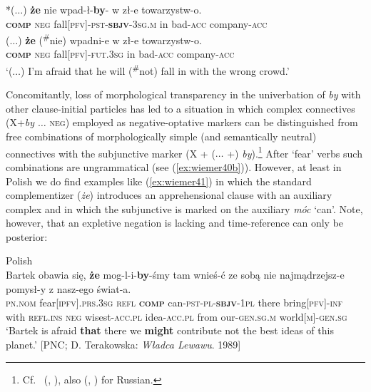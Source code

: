 \documentclass[output=paper,colorlinks,citecolor=brown]{langscibook}
\begin{document}
\ex \label{ex:wiemer40b}
\gll \textnormal{*($\ldots$)} \textbf{że} nie wpad-ł-\textbf{by}-\emptyset {} w zł-e towarzystw-o. \\
{} \textbf{\textsc{comp}} \textsc{neg} fall\textsc{[pfv]-pst-\textbf{sbjv}-3sg.m} in bad-\textsc{acc} company-\textsc{acc} \\
\ex \label{ex:wiemer40c}
\gll \textnormal{($\ldots$)} \textbf{że} (\textsuperscript{\#}nie) wpadni-e w zł-e towarzystw-o. \\
{} \textbf{\textsc{comp}} \textsc{neg} fall\textsc{[pfv]-fut.3sg} in bad-\textsc{acc} company-\textsc{acc} \\
\glt `($\ldots$) I'm afraid that he will (\textsuperscript{\#}not) fall in with the wrong crowd.'
\z
\z


Concomitantly, loss of morphological transparency in the univerbation of \textit{by} with other clause-initial particles has led to a situation in which complex connectives (X+\textit{by $\ldots$} \textsc{neg}) employed as negative-optative markers can be distinguished from free combinations of morphologically simple (and semantically neutral) connectives with the subjunctive marker (X + ($\ldots$ +) \textit{by}).\footnote{Cf.\ \citeauthor{Wiemer2015} (\citeyear{Wiemer2015}, \citeyear[\S3.1]{Wiemer2023}), also \citeauthor{Dobrushina2012} (\citeyear{Dobrushina2012}, \citeyear[322--327]{Dobrushina2016}) for Russian.} After `fear' verbs such combinations are ungrammatical (see (\ref{ex:wiemer40b})). However, at least in Polish we do find examples like (\ref{ex:wiemer41}) in which the standard complementizer (\textit{że}) introduces an apprehensional clause with an auxiliary complex and in which the subjunctive is marked on the auxiliary \textit{móc} `can'. Note, however, that an expletive negation is lacking and time-reference can only be posterior:


\ea 
\label{ex:wiemer41} 
\textnormal{Polish} \\
\gll Bartek obawia się, \textbf{że} mog-l-i-\textbf{by}-śmy tam wnieś-ć ze sobą nie najmądrzejsz-e pomysł-y z nasz-ego świat-a. \\
\textsc{pn.nom} fear\textsc{[ipfv].prs.3sg} \textsc{refl} \textbf{\textsc{comp}} can-\textsc{pst-pl-\textbf{sbjv}-1pl} there bring\textsc{[pfv]-inf} with \textsc{refl.ins} \textsc{neg} wisest-\textsc{acc.pl} idea-\textsc{acc.pl} from our-\textsc{gen.sg.m} world\textsc{[m]-gen.sg} \\
\glt `Bartek is afraid \textbf{that} there we \textbf{might} contribute not the best ideas of this planet.' {[PNC; D. Terakowska: \textit{Władca Lewawu}. 1989]}
\z
\end{document}
